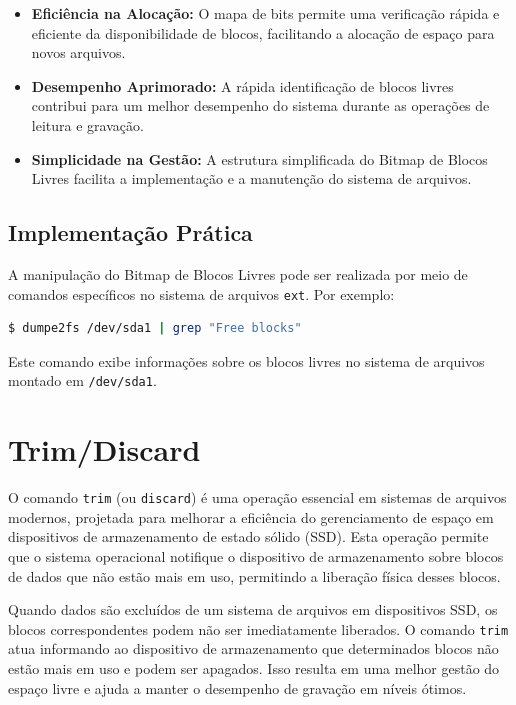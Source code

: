 \documentclass[
	12pt,				%
	openright,			%
	oneside,			%
	a4paper,			%
	chapter=TITLE,		%
	english,			%
	french,				%
	spanish,			%
	brazil				%
	]{abntex2}
\theoremstyle{definition}
\begin{document}
\begin{itemize}
    \item \textbf{Eficiência na Alocação:} O mapa de bits permite uma verificação rápida e eficiente da disponibilidade de blocos, facilitando a alocação de espaço para novos arquivos.
    
    \item \textbf{Desempenho Aprimorado:} A rápida identificação de blocos livres contribui para um melhor desempenho do sistema durante as operações de leitura e gravação.
    
    \item \textbf{Simplicidade na Gestão:} A estrutura simplificada do Bitmap de Blocos Livres facilita a implementação e a manutenção do sistema de arquivos.
\end{itemize}

\subsection{Implementação Prática}
A manipulação do Bitmap de Blocos Livres pode ser realizada por meio de comandos específicos no sistema de arquivos \texttt{ext}. Por exemplo:

\begin{lstlisting}[language=bash, caption={Exemplo de Manipulação do Bitmap de Blocos Livres}]
$ dumpe2fs /dev/sda1 | grep "Free blocks"
\end{lstlisting}

Este comando exibe informações sobre os blocos livres no sistema de arquivos montado em \texttt{/dev/sda1}.

\section{Trim/Discard}

O comando \texttt{trim} (ou \texttt{discard}) é uma operação essencial em sistemas de arquivos modernos, projetada para melhorar a eficiência do gerenciamento de espaço em dispositivos de armazenamento de estado sólido (SSD). Esta operação permite que o sistema operacional notifique o dispositivo de armazenamento sobre blocos de dados que não estão mais em uso, permitindo a liberação física desses blocos.

Quando dados são excluídos de um sistema de arquivos em dispositivos SSD, os blocos correspondentes podem não ser imediatamente liberados. O comando \texttt{trim} atua informando ao dispositivo de armazenamento que determinados blocos não estão mais em uso e podem ser apagados. Isso resulta em uma melhor gestão do espaço livre e ajuda a manter o desempenho de gravação em níveis ótimos.
\end{document}
